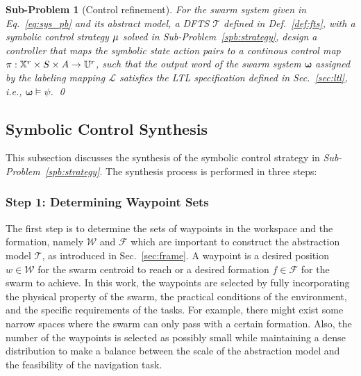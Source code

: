 \documentclass[letterpaper, 10 pt, conference]{ieeeconf}
\newtheorem{subproblem}{Sub-Problem}
\begin{document}
\begin{subproblem}[Control refinement]
\label{spb:control}
For the swarm system given in Eq.~\eqref{eq:sys_pb} and its abstract model, a DFTS $\mathcal{T}$ defined in Def.~\ref{def:fts}, with a symbolic control strategy $\mu$ solved in \textit{Sub-Problem~\ref{spb:strategy}}, design a controller that maps the symbolic state action pairs to a continous control map %
 $ \pi:\mathbb{X}^r\times S \times A\rightarrow \mathbb U^r$,
such that the output word of the swarm system $\pmb{\omega}$ assigned by the labeling mapping $\mathcal{L}$ satisfies the LTL specification defined in Sec.~\ref{sec:ltl}, i.e., $\pmb{\omega} \models \psi$.
\qed
\end{subproblem}



\subsection{Symbolic Control Synthesis}
\label{sec:scs}
This subsection discusses the synthesis of the symbolic control strategy in \textit{Sub-Problem~\ref{spb:strategy}}. The synthesis process is performed in three steps:
 
\subsubsection{Step 1: Determining Waypoint Sets}
The first step is to determine the sets of waypoints in the workspace and the formation, namely $\mathcal{W}$ and $\mathcal{F}$ which are important to construct the abstraction model $\mathcal{T}$, as introduced in Sec.~\ref{sec:frame}.
A waypoint is a desired position $w\!\in\!\mathcal{W}$ for the swarm centroid to reach or a desired formation $f\!\in\!\mathcal{F}$ for the swarm to achieve.
In this work, the waypoints are selected by fully incorporating the physical property of the swarm, the practical conditions of the environment, and the specific requirements of the tasks.  For example, there might exist some narrow spaces where the swarm can only pass with a certain formation. Also,  the number of the waypoints is selected as possibly small while maintaining a dense distribution to make a balance between the scale of the abstraction model and the feasibility of the navigation task.
\end{document}
